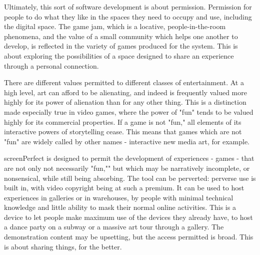 Ultimately, this sort of software development is about permission. Permission for people to do what they like in the spaces they need to occupy and use, including the digital space. The game jam, which is a locative, people-in-the-room phenomena, and the value of a small community which helps one another to develop, is reflected in the variety of games produced for the system. This is about exploring the possibilities of a space designed to share an experience through a personal connection.

There are different values permitted to different classes of entertainment. At a high level, art can afford to be alienating, and indeed is frequently valued more highly for its power of alienation than for any other thing. This is a distinction made especially true in video games, where the power of "fun" tends to be valued highly for its commercial properties. If a game is not "fun," all elements of its interactive powers of storytelling cease. This means that games which are not "fun" are widely called by other names - interactive new media art, for example.

screenPerfect is designed to permit the development of experiences - games - that are not only not necessarily "fun,"" but which may be narratively incomplete, or nonsensical, while still being absorbing. The tool can be perverted: perverse use is built in, with video copyright being at such a premium. It can be used to host experiences in galleries or in warehouses, by people with minimal technical knowledge and little ability to mask their normal online activities. This is a device to let people make maximum use of the devices they already have, to host a dance party on a subway or a massive art tour through a gallery. The demonstration content may be upsetting, but the access permitted is broad. This is about sharing things, for the better.

